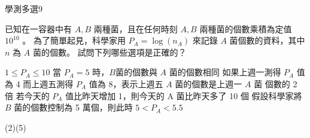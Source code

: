     \begin{QUESTION}
        \begin{ExamInfo}{97}{學測}{多選}{9}
        \end{ExamInfo}
        \begin{ExamAnsRateInfo}{33}{65}{24}{10}
        \end{ExamAnsRateInfo}
        \begin{QBODY}
            已知在一容器中有 $A,B$ 兩種菌，且在任何時刻 $A,B$ 兩種菌的個數乘積為定值 $10^{10}$ 。
            為了簡單起見，科學家用 $P_A =\log (n_A)$ 來記錄 $A$ 菌個數的資料，其中 $n$  為 $A$ 菌的個數。
            試問下列哪些選項是正確的？
			\begin{QOPS}
				\QOP $1 \leq P_A \leq 10$
				\QOP 當 $P_A =5$ 時，$B$菌的個數與 $A$ 菌的個數相同 
				\QOP 如果上週一測得 $P_A$ 值為 4 而上週五測得 $P_A$ 值為 8，表示上週五 $A$ 菌的個數是上週一 $A$ 菌
			個數的 2 倍 
				\QOP 若今天的 $P_A$ 值比昨天增加 1，則今天的 A 菌比昨天多了 10 個 
				\QOP 假設科學家將 $B$ 菌的個數控制為 5 萬個，則此時 $5<P_A <5.5$
			\end{QOPS}
        \end{QBODY}
        \begin{QFROMS}
        \end{QFROMS}
        \begin{QTAGS}\end{QTAGS}
        \begin{QANS}
            (2)(5)
        \end{QANS}
        \begin{QSOLLIST}
        \end{QSOLLIST}
        \begin{QEMPTYSPACE}
        \end{QEMPTYSPACE}
    \end{QUESTION}
